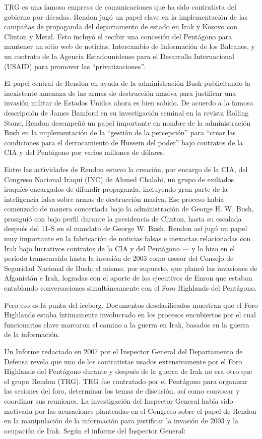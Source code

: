 \documentclass[10pt,a5paper,twoside,spanish,]{book}
\begin{document}
TRG es una famosa empresa de comunicaciones que ha sido contratista del
gobierno por décadas. Rendon jugó un papel clave en la implementación de
las campañas de propaganda del departamento de estado en Irak y Kosovo
con Clinton y Metzl. Esto incluyó el recibir una concesión del Pentágono
para mantener un sitio web de noticias, Intercambio de Información de
los Balcanes, y un contrato de la Agencia Estadounidense para el
Desarrollo Internacional (USAID) para promover las ``privatizaciones''.

El papel central de Rendon en ayuda de la administración Bush
publicitando la inexistente amenaza de las armas de destrucción masiva
para justificar una invasión militar de Estados Unidos ahora es bien
sabido. De acuerdo a la famosa descripción de James Bamford en su
investigación seminal en la revista Rolling Stone, Rendon desempeñó un
papel importante en nombre de la administración Bush en la
implementación de la ``gestión de la percepción'' para ``crear las
condiciones para el derrocamiento de Hussein del poder'' bajo contratos
de la CIA y del Pentágono por varios millones de dólares.

Entre las actividades de Rendon estuvo la creación, por encargo de la
CIA, del Congreso Nacional Iraquí (INC) de Ahmed Chalabi, un grupo de
exiliados iraquíes encargados de difundir propaganda, incluyendo gran
parte de la inteligencia falsa sobre armas de destrucción masiva. Ese
proceso había comenzado de manera concertada bajo la administración de
George H. W. Bush, prosiguió con bajo perfil durante la presidencia de
Clinton, hasta su escalada después del 11-S en el mandato de George W.
Bush. Rendon así jugó un papel muy importante en la fabricación de
noticias falsas e inexactas relacionadas con Irak bajo lucrativos
contratos de la CIA y del Pentágono --- y lo hizo en el período
transcurrido hasta la invasión de 2003 como asesor del Consejo de
Seguridad Nacional de Bush: el mismo, por supuesto, que planeó las
invasiones de Afganistán e Irak, logradas con el aporte de los
ejecutivos de Enron que estaban entablando conversaciones
simultáneamente con el Foro Highlands del Pentágono.

Pero eso es la punta del iceberg. Documentos desclasificados muestran
que el Foro Highlands estaba íntimamente involucrado en los procesos
encubiertos por el cual funcionarios clave marcaron el camino a la
guerra en Irak, basados en la guerra de la información.

Un Informe redactado en 2007 por el Inspector General del Departamento
de Defensa revela que uno de los contratistas usados extensivamente por
el Foro Highlands del Pentágono durante y después de la guerra de Irak
no era otro que el grupo Rendon (TRG). TRG fue contratado por el
Pentágono para organizar las sesiones del foro, determinar los temas de
discusión, así como convocar y coordinar sus reuniones. La investigación
del Inspector General había sido motivada por las acusaciones planteadas
en el Congreso sobre el papel de Rendon en la manipulación de la
información para justificar la invasión de 2003 y la ocupación de Irak.
Según el informe del Inspector General:
\end{document}

